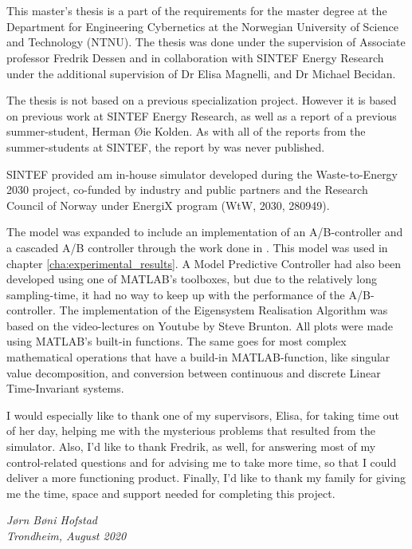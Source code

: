 \chapter*{\englishprefacename}

This master's thesis is a part of the requirements for the master degree at the Department for Engineering Cybernetics at the Norwegian University of Science and Technology (NTNU). The thesis was done under the supervision of Associate professor Fredrik Dessen and in collaboration with SINTEF Energy Research under the additional supervision of Dr Elisa Magnelli, and Dr Michael Becidan. 

The thesis is not based on a previous specialization project. However it is based on previous work at SINTEF Energy Research, as well as a report  of a previous summer-student, Herman Øie Kolden. As with all of the reports from the summer-students at SINTEF, the report by \cite{summer_student} was never published. 

\noindent
SINTEF provided am in-house simulator developed during the Waste-to-Energy 2030 project, co-funded by industry and public partners and the Research Council of Norway under EnergiX program (WtW, 2030, 280949).

\noindent
The model was expanded to include an implementation of an A/B-controller and a cascaded A/B controller through the work done in \cite{summer_student}. This model was used in chapter \ref{cha:experimental_results}. A Model Predictive Controller had also been developed using one of MATLAB's toolboxes, but due to the relatively long sampling-time, it had no way to keep up with the performance of the A/B-controller. The implementation of the Eigensystem Realisation Algorithm was based on the video-lectures on Youtube by Steve Brunton. All plots were made using MATLAB's built-in functions. The same goes for most complex mathematical operations that have a build-in MATLAB-function, like singular value decomposition, and conversion between continuous and discrete Linear Time-Invariant systems. 


\noindent
I would especially like to thank one of my supervisors, Elisa, for taking time out of her day, helping me with the mysterious problems that resulted from the simulator. Also, I'd like to thank Fredrik, as well, for answering most of my control-related questions and for advising me to take more time, so that I could deliver a more functioning product. Finally, I'd like to thank my family for giving me the time, space and support needed for completing this project. 

\hfill {\it Jørn Bøni Hofstad}\\[-6mm]

\hfill {\it Trondheim, August 2020}
%

\clearpage
